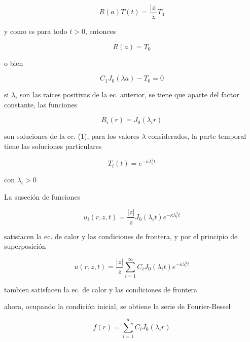 \documentclass[12pt,a4paper]{article}
\begin{document}
\begin{enumerate}
   \begin{equation*}
       R(a)T(t)=\frac{|z|}{z} T_0
   \end{equation*}
   
   y como es para todo $t > 0$, entonces
   
   \begin{equation*}
       R(a)=T_0
   \end{equation*}
   
   o bien
   
   \begin{equation*}
       C_1J_0(\lambda a) - T_0 = 0
   \end{equation*}
   
   
   si $\lambda_i$ son las raíces positivas de la ec. anterior, se tiene que aparte del factor constante, las funciones
   
   \begin{equation*}
       R_i(r)=J_0(\lambda_i r)
   \end{equation*}
   
   son soluciones de la ec. (1), para los valores $\lambda$ considerados, la parte temporal tiene las soluciones particulares
   
   \begin{equation*}
       T_i(t)= e^{-\kappa \lambda_{i}^{2} t}
   \end{equation*}
   
   con $\lambda_i > 0$
   
   La suseción de funciones 
   
   \begin{equation*}
       u_i(r,z,t)= \frac{|z|}{z}J_0(\lambda_i t) e^{-\kappa \lambda_{i}^{2}t}
   \end{equation*}
   
   satisfacen la ec. de calor y las condiciones de frontera, y por el principio de superposición
   
   \begin{equation*}
       u(r,z,t)=\frac{|z|}{z} \sum_{i=1}^{\infty}C_i J_0(\lambda_i t) e^{-\kappa \lambda_{i}^{2}t}
   \end{equation*}
   
   tambien satisfacen la ec. de calor y las condiciones de frontera
   
   ahora, ocupando la condición inicial, se obtiene la serie de Fourier-Bessel
   
   \begin{equation*}
       f(r)= \sum_{i=1}^{\infty}C_i J_0(\lambda_i r)
   \end{equation*}
   

\end{enumerate}
\end{document}
